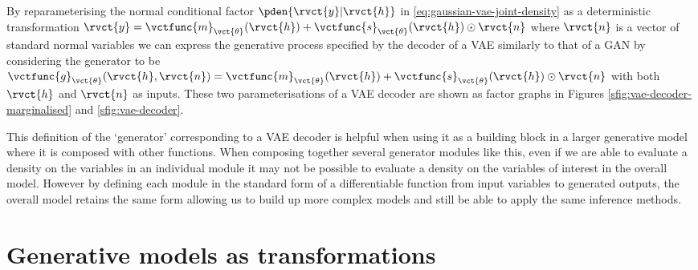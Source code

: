 By reparameterising the normal conditional factor $\pden{\rvct{y}|\rvct{h}}$ in \eqref{eq:gaussian-vae-joint-density} as a deterministic transformation $\rvct{y} = \vctfunc{m}_{\vct{\theta}}(\rvct{h}) + \vctfunc{s}_{\vct{\theta}}(\rvct{h}) \odot \rvct{n}$ where $\rvct{n}$ is a vector of standard normal variables we can express the generative process specified by the decoder of a \ac{VAE} similarly to that of a \ac{GAN} by considering the generator to be $\vctfunc{g}_{\vct{\theta}}(\rvct{h},\rvct{n}) = \vctfunc{m}_{\vct{\theta}}(\rvct{h}) + \vctfunc{s}_{\vct{\theta}}(\rvct{h}) \odot \rvct{n}$ with both $\rvct{h}$ and $\rvct{n}$ as inputs. These two parameterisations of a \ac{VAE} decoder are shown as factor graphs in Figures \ref{sfig:vae-decoder-marginalised} and \ref{sfig:vae-decoder}. 

This definition of the `generator' corresponding to a \ac{VAE} decoder is helpful when using it as a building block in a larger generative model where it is composed with other functions. When composing together several generator modules like this, even if we are able to evaluate a density on the variables in an individual module it may not be possible to evaluate a density on the variables of interest in the overall model. However by defining each module in the standard form of a differentiable function from input variables to generated outputs, the overall model retains the same form allowing us to build up more complex models and still be able to apply the same inference methods. %


\section{Generative models as transformations}\label{sec:generative-models-as-transformations}

